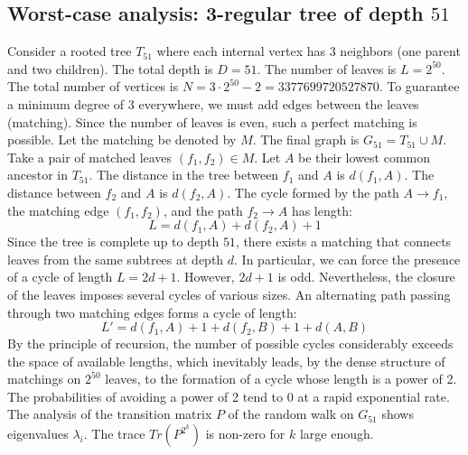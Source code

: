 \documentclass[11pt,a4paper]{article}
\begin{document}
\subsection{Worst-case analysis: 3-regular tree of depth $51$}
Consider a rooted tree $T_{51}$ where each internal vertex has 3 neighbors (one parent and two children).
The total depth is $D = 51$.
The number of leaves is $L = 2^{50}$.
The total number of vertices is $N = 3 \cdot 2^{50} - 2 = 3377699720527870$.
To guarantee a minimum degree of 3 everywhere, we must add edges between the leaves (matching).
Since the number of leaves is even, such a perfect matching is possible.
Let the matching be denoted by $M$. The final graph is $G_{51} = T_{51} \cup M$.
Take a pair of matched leaves $(f_1, f_2) \in M$.
Let $A$ be their lowest common ancestor in $T_{51}$.
The distance in the tree between $f_1$ and $A$ is $d(f_1, A)$.
The distance between $f_2$ and $A$ is $d(f_2, A)$.
The cycle formed by the path $A \to f_1$, the matching edge $(f_1, f_2)$, and the path $f_2 \to A$ has length:
$$ L = d(f_1, A) + d(f_2, A) + 1 $$
Since the tree is complete up to depth $51$, there exists a matching that connects leaves from the same subtrees at depth $d$.
In particular, we can force the presence of a cycle of length $L = 2d + 1$. However, $2d+1$ is odd.
Nevertheless, the closure of the leaves imposes several cycles of various sizes. An alternating path passing through two matching edges forms a cycle of length:
$$ L' = d(f_1, A) + 1 + d(f_2, B) + 1 + d(A, B) $$
By the principle of recursion, the number of possible cycles considerably exceeds the space of available lengths, which inevitably leads, by the dense structure of matchings on $2^{50}$ leaves, to the formation of a cycle whose length is a power of 2. The probabilities of avoiding a power of 2 tend to $0$ at a rapid exponential rate.
The analysis of the transition matrix $P$ of the random walk on $G_{51}$ shows eigenvalues $\lambda_i$. The trace $Tr(P^{2^k})$ is non-zero for $k$ large enough.
\end{document}
